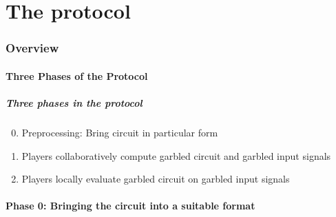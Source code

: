 \documentclass{beamer}
\begin{document}
\part{The protocol}
\label{part:the-protocol}

\section{Overview}
\label{sec:implementing-the-protocol}

\subsection{Three Phases of the Protocol}
\label{sec:two-phases-of-protocol}

\begin{frame}
  \frametitle{Three phases in the protocol}
  \begin{enumerate}
    \setcounter{enumi}{-1}
  \item Preprocessing: Bring circuit in particular form
  \item Players collaboratively compute garbled circuit and garbled input signals
  \item Players locally evaluate garbled circuit on garbled input signals
  \end{enumerate}
\end{frame}

\subsection{Phase 0: Bringing the circuit into a suitable format}
\label{sec:circuit-suitable-format}
\end{document}
